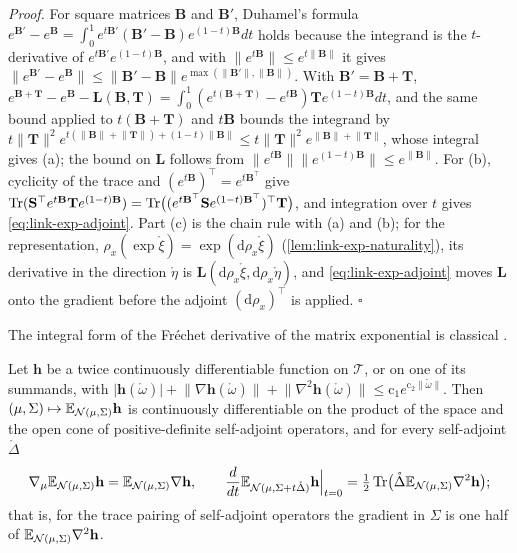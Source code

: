 \noindent\emph{Proof.}
For square matrices $\mathbf B$ and $\mathbf B'$, Duhamel's formula
$e^{\mathbf B'}-e^{\mathbf B}=\int_0^1e^{t\mathbf B'}(\mathbf B'-\mathbf B)e^{(1-t)\mathbf B}dt$ holds because the
integrand is the $t$-derivative of $e^{t\mathbf B'}e^{(1-t)\mathbf B}$, and with
$\lVert e^{t\mathbf B}\rVert\leq e^{t\lVert\mathbf B\rVert}$ it gives
$\lVert e^{\mathbf B'}-e^{\mathbf B}\rVert\leq\lVert\mathbf B'-\mathbf B\rVert e^{\max(\lVert\mathbf B'\rVert,\lVert\mathbf B\rVert)}$.
With $\mathbf B'=\mathbf B+\mathbf T$,
$e^{\mathbf B+\mathbf T}-e^{\mathbf B}-\mathbf L(\mathbf B,\mathbf T)=\int_0^1(e^{t(\mathbf B+\mathbf T)}-e^{t\mathbf B})\mathbf Te^{(1-t)\mathbf B}dt$,
and the same bound applied to $t(\mathbf B+\mathbf T)$ and $t\mathbf B$ bounds the integrand by
$t\lVert\mathbf T\rVert^2e^{t(\lVert\mathbf B\rVert+\lVert\mathbf T\rVert)+(1-t)\lVert\mathbf B\rVert}\leq t\lVert\mathbf T\rVert^2e^{\lVert\mathbf B\rVert+\lVert\mathbf T\rVert}$,
whose integral gives (a); the bound on $\mathbf L$ follows from
$\lVert e^{t\mathbf B}\rVert\lVert e^{(1-t)\mathbf B}\rVert\leq e^{\lVert\mathbf B\rVert}$.
For (b), cyclicity of the trace and $(e^{t\mathbf B})^\top=e^{t\mathbf B^\top}$ give
$\operatorname{Tr}(\mathbf S^\top e^{t\mathbf B}\mathbf Te^{(1-t)\mathbf B})=\operatorname{Tr}\bigl((e^{t\mathbf B^\top}\mathbf Se^{(1-t)\mathbf B^\top})^\top\mathbf T\bigr)$,
and integration over $t$ gives \eqref{eq:link-exp-adjoint}. Part (c) is the chain rule with (a) and (b);
for the representation, $\rho_x(\exp\mathring\xi)=\exp(\mathrm d\rho_x\mathring\xi)$ (\cref{lem:link-exp-naturality}),
its derivative in the direction $\mathring\eta$ is $\mathbf L(\mathrm d\rho_x\mathring\xi,\mathrm d\rho_x\mathring\eta)$, and
\eqref{eq:link-exp-adjoint}
moves $\mathbf L$ onto the gradient before the adjoint $(\mathrm d\rho_x)^\top$ is applied. \hfill$\square$

The integral form of the Fr\'echet derivative of the matrix exponential is classical \citep[Ch.~10]{Higham2008}.

Let $\mathbf h$ be a twice continuously differentiable function on $\mathscr T$, or on one of its summands,
with
$\lvert\mathbf h(\mathring\omega)\rvert+\lVert\nabla\mathbf h(\mathring\omega)\rVert+\lVert\nabla^2\mathbf h(\mathring\omega)\rVert\leq\mathrm c_1e^{\mathrm c_2\lVert\mathring\omega\rVert}$.
Then $(\mu,\Sigma)\mapsto\mathbb E_{\mathcal N(\mu,\Sigma)}\mathbf h$ is continuously differentiable on the product
of the space and the open cone of positive-definite self-adjoint operators, and for every self-adjoint
$\mathring\Delta$
\begin{equation}
\nabla_\mu\mathbb E_{\mathcal N(\mu,\Sigma)}\mathbf h=\mathbb E_{\mathcal N(\mu,\Sigma)}\nabla\mathbf h,
\qquad
\frac{d}{dt}\mathbb E_{\mathcal N(\mu,\Sigma+t\mathring\Delta)}\mathbf h\Big|_{t=0}=\tfrac12\operatorname{Tr}\bigl(\mathring\Delta\mathbb E_{\mathcal N(\mu,\Sigma)}\nabla^2\mathbf h\bigr);
\label{eq:link-bonnet-price}
\end{equation}
that is, for the trace pairing of self-adjoint operators the gradient in $\Sigma$ is one half of
$\mathbb E_{\mathcal N(\mu,\Sigma)}\nabla^2\mathbf h$. 

